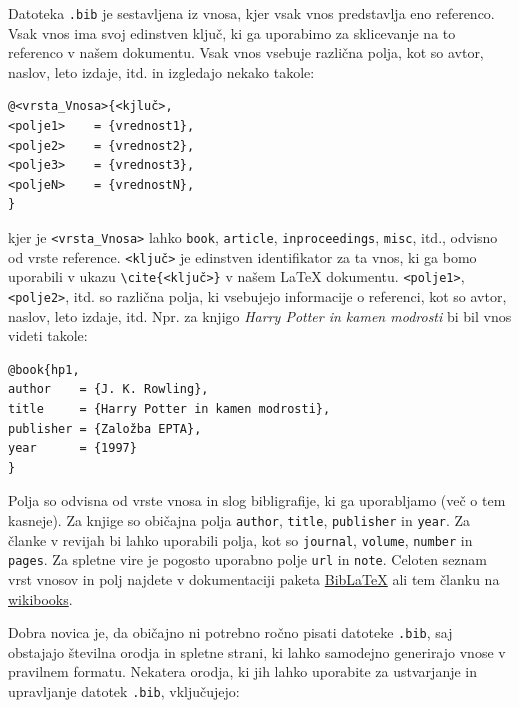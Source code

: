 Datoteka \texttt{.bib} je sestavljena iz vnosa, kjer vsak vnos predstavlja eno referenco.
Vsak vnos ima svoj edinstven ključ, ki ga uporabimo za sklicevanje na to referenco v našem dokumentu.
Vsak vnos vsebuje različna polja, kot so avtor, naslov, leto izdaje, itd. in izgledajo nekako takole:

\begin{verbatim}
@<vrsta_Vnosa>{<kjluč>,
<polje1>    = {vrednost1},
<polje2>    = {vrednost2},
<polje3>    = {vrednost3}, 
<poljeN>    = {vrednostN}, 
}
\end{verbatim}

kjer je \texttt{\textless vrsta\_Vnosa\textgreater } lahko \texttt{book}, \texttt{article}, \texttt{inproceedings}, \texttt{misc}, itd., odvisno od vrste reference.
\texttt{\textless ključ\textgreater } je edinstven identifikator za ta vnos, ki ga bomo uporabili v ukazu \texttt{{\textbackslash}cite\{\textless ključ\textgreater \}} v našem LaTeX dokumentu.
\texttt{\textless polje1\textgreater }, \texttt{\textless polje2\textgreater }, itd. so različna polja, ki vsebujejo informacije o referenci, kot so avtor, naslov, leto izdaje, itd. Npr. za knjigo \textit{Harry Potter in kamen modrosti} bi bil vnos videti takole:

\begin{verbatim}
@book{hp1,
author    = {J. K. Rowling},
title     = {Harry Potter in kamen modrosti},
publisher = {Založba EPTA},
year      = {1997}
}
\end{verbatim}

Polja so odvisna od vrste vnosa in slog bibligrafije, ki ga uporabljamo (več o tem kasneje). Za knjige so običajna polja \texttt{author}, \texttt{title}, \texttt{publisher} in \texttt{year}. Za članke v revijah bi lahko uporabili polja, kot so \texttt{journal}, \texttt{volume}, \texttt{number} in \texttt{pages}. Za spletne vire je pogosto uporabno polje \texttt{url} in \texttt{note}.
Celoten seznam vrst vnosov in polj najdete v dokumentaciji paketa \href{https://ctan.org/pkg/biblatex?lang=en}{BibLaTeX} ali tem članku na \href{https://en.wikibooks.org/wiki/LaTeX/Bibliography\_Management\#Entry\_and\_field\_types\_in\_.bib\_files}{wikibooks}.

Dobra novica je, da običajno ni potrebno ročno pisati datoteke \texttt{.bib}, saj obstajajo številna orodja in spletne strani, ki lahko samodejno generirajo vnose v pravilnem formatu.
Nekatera orodja, ki jih lahko uporabite za ustvarjanje in upravljanje datotek \texttt{.bib}, vključujejo:

